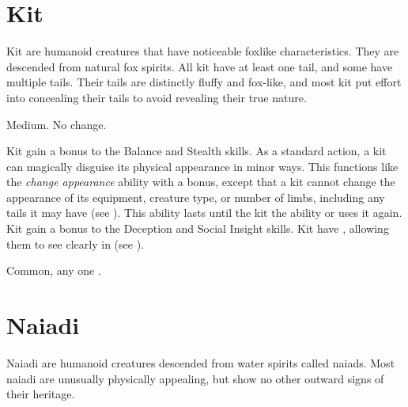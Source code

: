 \section{Kit}

  Kit are humanoid creatures that have noticeable foxlike characteristics.
  They are descended from natural fox spirits.
  All kit have at least one tail, and some have multiple tails.
  Their tails are distinctly fluffy and fox-like, and most kit put effort into concealing their tails to avoid revealing their true nature.

   Medium.
   No change.
  \begin{itemize}
     Kit gain a  bonus to the Balance and Stealth skills.
     As a standard action, a kit can magically disguise its physical appearance in minor ways.
      This functions like the \textit{change appearance} ability with a  bonus, except that a kit cannot change the appearance of its equipment, creature type, or number of limbs, including any tails it may have (see ).
      This ability lasts until the kit  the ability or uses it again.
     Kit gain a  bonus to the Deception and Social Insight skills.
     Kit have , allowing them to see clearly in  (see ).
  \end{itemize}
   Common, any one .

\section{Naiadi}
  Naiadi are humanoid creatures descended from water spirits called naiads.
  Most naiadi are unusually physically appealing, but show no other outward signs of their heritage.

